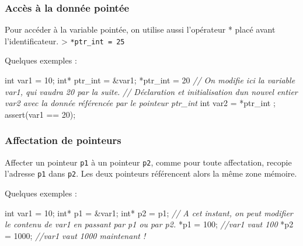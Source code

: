 \documentclass[11pt]{article}
\newenvironment{Shaded}{}{}
\newcommand{\DataTypeTok}[1]{\textcolor[rgb]{0.56,0.13,0.00}{{#1}}}
\newcommand{\DecValTok}[1]{\textcolor[rgb]{0.25,0.63,0.44}{{#1}}}
\newcommand{\CommentTok}[1]{\textcolor[rgb]{0.38,0.63,0.69}{\textit{{#1}}}}
\newcommand{\NormalTok}[1]{{#1}}
\begin{document}
    \hypertarget{accuxe8s-uxe0-la-donnuxe9e-pointuxe9e}{%
\subsubsection{Accès à la donnée
pointée}\label{accuxe8s-uxe0-la-donnuxe9e-pointuxe9e}}

Pour accéder à la variable pointée, on utilise aussi l'opérateur * placé
avant l'identificateur. \textgreater{} \texttt{*ptr\_int\ =\ 25}

Quelques exemples :

\begin{Shaded}
\begin{Highlighting}[]
    \DataTypeTok{int}\NormalTok{ var1 = }\DecValTok{10}\NormalTok{;}
    \DataTypeTok{int}\NormalTok{* ptr\_int = \&var1;}
\NormalTok{    *ptr\_int = }\DecValTok{20} \CommentTok{// On modifie ici la variable var1, qui vaudra 20 par la suite.}
    \CommentTok{// Déclaration et initialisation d\textquotesingle{}un nouvel entier var2 avec la donnée référencée par le pointeur ptr\_int}
    \DataTypeTok{int}\NormalTok{ var2 = *ptr\_int ; }
\NormalTok{    assert(var1 == }\DecValTok{20}\NormalTok{);}
\end{Highlighting}
\end{Shaded}

    \hypertarget{affectation-de-pointeurs}{%
\subsubsection{Affectation de
pointeurs}\label{affectation-de-pointeurs}}

Affecter un pointeur \texttt{p1} à un pointeur \texttt{p2}, comme pour
toute affectation, recopie l'adresse \texttt{p1} dans \texttt{p2}. Les
deux pointeurs référencent alors la même zone mémoire.

Quelques exemples :

\begin{Shaded}
\begin{Highlighting}[]
    \DataTypeTok{int}\NormalTok{ var1 = }\DecValTok{10}\NormalTok{;}
    \DataTypeTok{int}\NormalTok{* p1 = \&var1;}
    \DataTypeTok{int}\NormalTok{* p2 = p1;}
    \CommentTok{// A cet instant, on peut modifier le contenu de var1 en passant par p1 ou par p2.}
\NormalTok{    *p1 = }\DecValTok{100}\NormalTok{; }\CommentTok{//var1 vaut 100}
\NormalTok{    *p2 = }\DecValTok{1000}\NormalTok{; }\CommentTok{//var1 vaut 1000 maintenant !}
\end{Highlighting}
\end{Shaded}
\end{document}
